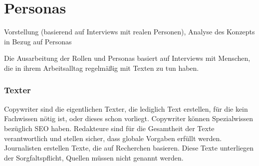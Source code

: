 \section{Personas}\label{l:personas}

Vorstellung (basierend auf Interviews mit realen Personen), Analyse des Konzepts in Bezug auf Personas

Die Ausarbeitung der Rollen und Personas basiert auf Interviews mit Menschen, die in ihrem Arbeitsalltag regelmäßig mit Texten zu tun haben.


\subsubsection{Texter}

Copywriter sind die eigentlichen Texter, die lediglich Text erstellen, für die kein Fachwissen nötig ist, oder dieses schon vorliegt. Copywriter können Spezialwissen bezüglich SEO haben. Redakteure sind für die Gesamtheit der Texte verantwortlich und stellen sicher, dass globale Vorgaben erfüllt werden. Journalisten erstellen Texte, die auf Recherchen basieren. Diese Texte unterliegen der Sorgfaltspflicht, Quellen müssen nicht genannt werden. 